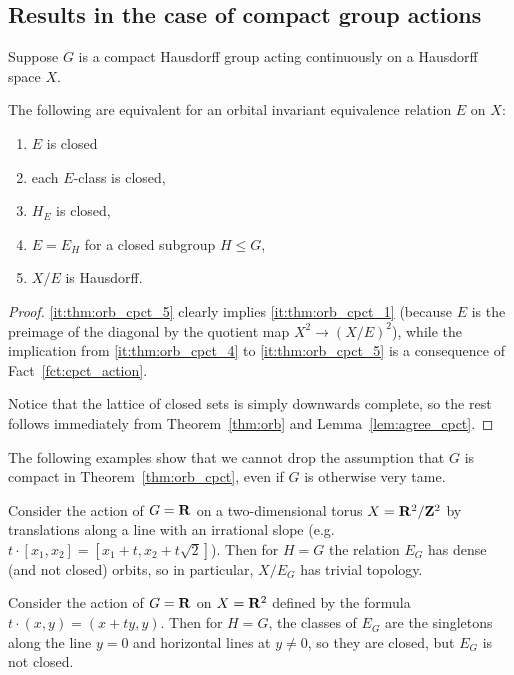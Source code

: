 	
	
	\subsection*{Results in the case of compact group actions}
	
	
	
	\begin{thm}
		\label{thm:orb_cpct}
		Suppose $G$ is a compact Hausdorff group acting continuously on a Hausdorff space $X$.
		
		The following are equivalent for an orbital invariant equivalence relation $E$ on $X$:
		\begin{enumerate}
			\item
			\label{it:thm:orb_cpct_1}
			$E$ is closed
			\item
			each $E$-class is closed,
			\item
			\label{it:thm:orb_cpct_3}
			$H_E$ is closed,
			\item
			\label{it:thm:orb_cpct_4}
			$E=E_H$ for a closed subgroup $H\leq G$,
			\item
			\label{it:thm:orb_cpct_5}
			$X/E$ is Hausdorff.
		\end{enumerate}
	\end{thm}
	\begin{proof}
		\ref{it:thm:orb_cpct_5} clearly implies \ref{it:thm:orb_cpct_1} (because $E$ is the preimage of the diagonal by the quotient map $X^2\to (X/E)^2$), while the implication from \ref{it:thm:orb_cpct_4} to \ref{it:thm:orb_cpct_5} is a consequence of Fact~\ref{fct:cpct_action}.
		
		Notice that the lattice of closed sets is simply downwards complete, so the rest follows immediately from Theorem~\ref{thm:orb} and Lemma~\ref{lem:agree_cpct}.
	\end{proof}
	
	The following examples show that we cannot drop the assumption that $G$ is compact in Theorem~\ref{thm:orb_cpct}, even if $G$ is otherwise very tame.
	\begin{ex}
		Consider the action of $G={\bf R}$ on a two-dimensional torus $X={\bf R}^2/{\bf Z}^2$ by translations along a line with an irrational slope (e.g.\ $t\cdot [x_1,x_2]=[x_1+t,x_2+ t\sqrt 2]$). Then for $H=G$ the relation $E_G$ has dense (and not closed) orbits, so in particular, $X/E_G$ has trivial topology.\xqed{\lozenge}
	\end{ex}
	
	\begin{ex}
		Consider the action of $G={\bf R}$ on $X={\bf R}^2$ defined by the formula $t\cdot (x,y)= (x+ty,y)$. Then for $H=G$, the classes of $E_G$ are the singletons along the line $y=0$ and horizontal lines at $y\neq 0$, so they are closed, but $E_G$ is not closed.\xqed{\lozenge}
	\end{ex}
	

